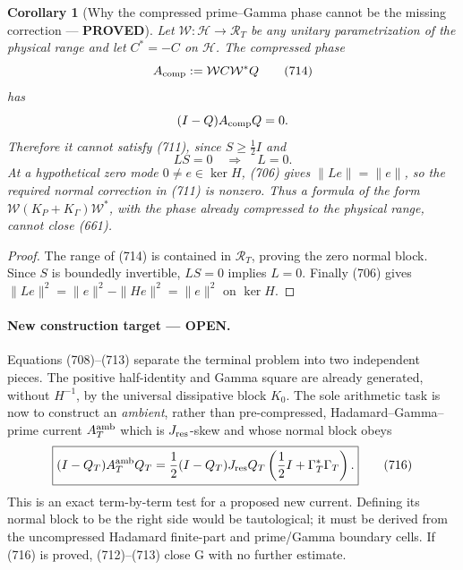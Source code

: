\documentclass[11pt]{article}
\newtheorem{corollary}[theorem]{Corollary}
\newcommand{\PROVED}{\textcolor{green!45!black}{\textbf{PROVED}}}
\newcommand{\OPEN}{\textcolor{red!70!black}{\textbf{OPEN}}}
\begin{document}
\begin{corollary}[Why the compressed prime--Gamma phase cannot be the
missing correction --- \PROVED]
Let \(\mathcal W:\mathcal H\to\mathscr R_T\) be any unitary
parametrization of the physical range and let \(C^*=-C\) on
\(\mathcal H\).  The compressed phase
\begin{equation}
 A_{\rm comp}:=\mathcal WC\mathcal W^*Q             \tag{714}
\end{equation}
has
\[
 (I-Q)A_{\rm comp}Q=0.
\]
Therefore it cannot satisfy (711), since \(S\ge\frac12I\) and
\begin{equation}
 LS=0\quad\Longrightarrow\quad L=0.                \tag{715}
\end{equation}
At a hypothetical zero mode \(0\ne e\in\ker H\), (706) gives
\(\|Le\|=\|e\|\), so the required normal correction in (711) is
nonzero.  Thus a formula of the form
\(\mathcal W(K_P+K_\Gamma)\mathcal W^*\), with the phase already compressed
to the physical range, cannot close (661).
\end{corollary}

\begin{proof}
The range of (714) is contained in \(\mathscr R_T\), proving the zero
normal block.  Since \(S\) is boundedly invertible, \(LS=0\) implies
\(L=0\).  Finally (706) gives
\(\|Le\|^2=\|e\|^2-\|He\|^2=\|e\|^2\) on \(\ker H\).
\end{proof}

\paragraph{New construction target --- \OPEN.}
Equations (708)--(713) separate the terminal problem into two independent
pieces.  The positive half-identity and Gamma square are already generated,
without \(H^{-1}\), by the universal dissipative block \(K_0\).  The sole
arithmetic task is now to construct an \emph{ambient}, rather than
pre-compressed, Hadamard--Gamma--prime current \(A_T^{\rm amb}\) which is
\(J_{\rm res}\)-skew and whose normal block obeys
\begin{equation}
 \boxed{
 (I-Q_T)A_T^{\rm amb}Q_T
 =\frac12(I-Q_T)J_{\rm res}Q_T
   \left(\frac12I+\Gamma_T^*\Gamma_T\right).}       \tag{716}
\end{equation}
This is an exact term-by-term test for a proposed new current.  Defining its
normal block to be the right side would be tautological; it must be derived
from the uncompressed Hadamard finite-part and prime/Gamma boundary cells.
If (716) is proved, (712)--(713) close G with no further estimate.
\end{document}
